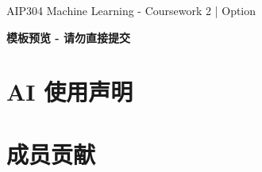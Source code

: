 \documentclass[11pt,a4paper]{article}
\newif\ifReportChinese
\newif\ifReportSubmission
\newcommand{\AIHeading}{AI 使用声明}
\newcommand{\ContributionHeading}{成员贡献}
\newcommand{\PreviewLabel}{模板预览 - 请勿直接提交}
\newcommand{\AIHeading}{AI-use disclosure}
\newcommand{\ContributionHeading}{Contributions}
\newcommand{\PreviewLabel}{TEMPLATE PREVIEW - NOT FOR SUBMISSION}
\begin{document}
{\LARGE\bfseries\ReportTitle\par}
\vspace{2pt}
{\normalsize AIP304 Machine Learning - Coursework 2 \quad | \quad Option \ReportOption\par}
{\normalsize\ReportAuthors\par}
\ifReportSubmission\else
  {\small\color{brown}\textbf{\PreviewLabel}\par}
\fi
\vspace{3pt}

\ifReportChinese
  
\else
  
\fi



\section*{\AIHeading}
\ReportAIDisclosure
\section*{\ContributionHeading}
\ReportContributions
\end{document}
